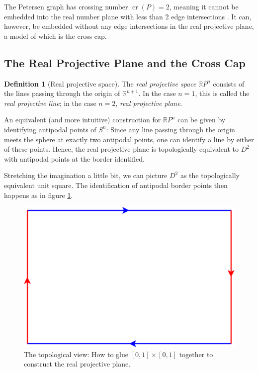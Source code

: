 \documentclass[11pt,            %
               a4paper,         %
               oneside,         %
               DIV12,           %
               fleqn,           %
               halfparskip,     %
               nochapterprefix, %
              ]{scrartcl} %
\theoremstyle{definition}
\newtheorem{definition}{Definition}
\begin{document}
The Petersen graph has crossing number $\operatorname{cr}(P) = 2$,
meaning it cannot be embedded into the real number plane with less than 2 edge
intersections \cite[p.~2]{crossingnr}. It can, however, be embedded
without any edge intersections in the real projective plane, a model
of which is the cross cap.

\subsection{The Real Projective Plane and the Cross Cap}
\label{sec:rp2}

\begin{definition}[Real projective space]
  The \emph{real projective space} $\mathbb{R}P^n$ consists of the lines
  passing through the origin of $\mathbb{R}^{n+1}$. In the case $n=1$,
  this is called the \emph{real projective line}; in the case $n=2$,
  \emph{real projective plane}.
\end{definition}
%
\begin{minipage}{0.55\textwidth}
  An equivalent (and more intuitive) construction for $\mathbb{R}P^n$
  can be given by identifying antipodal points of $S^n$: Since any
  line passing through the origin meets the sphere at exactly two
  antipodal points, one can identify a line by either of these points.
  Hence, the real projective plane is topologically equivalent to
  $D^2$ with antipodal points at the border identified.

  Stretching the imagination a little bit, we can picture $D^2$ as the
  topologically equivalent unit square. The identification of
  antipodal border points then happens as in figure \ref{fig:rp2}.
\end{minipage}%
\hfill%
\begin{minipage}{0.35\textwidth}
  \begin{figure}[H]
    \centering
    \includegraphics[keepaspectratio=true,width=\textwidth]{../planar-graphs/crosscap-construction.pdf}
    \caption{The topological view: How to glue $[0,1]\times[0,1]$
      together to construct the real projective plane.}
    \label{fig:rp2}
  \end{figure}
\end{minipage}%
\end{document}
